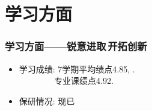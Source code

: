 \documentclass[10pt]{beamer}
\begin{document}
\section{学习方面}
\begin{frame}
\frametitle{学习方面——锐意进取$\,$开拓创新}
\begin{itemize}
\item 学习成绩: 7学期平均绩点4.85, {\color{red}{专业第二}}.\\
$\quad\quad\quad\quad\,$专业课绩点4.92.
\item 保研情况: 现已{\color{red}{保研至中国科学院数学与系统科学\\
}}
\end{itemize}
\end{frame}
\end{document}
